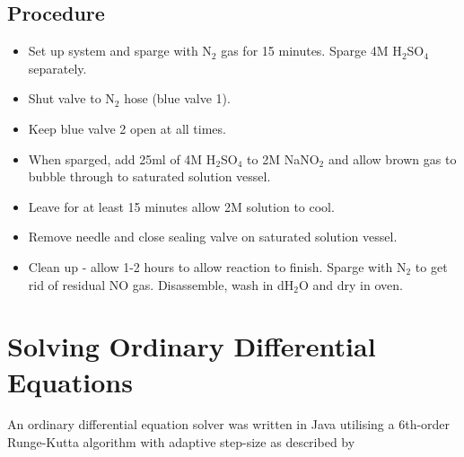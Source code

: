 \subsection*{Procedure}
\begin{itemize}
 \item Set up system and sparge with N$_{\textrm{2}}$ gas for 15 minutes. Sparge 4M H$_{\textrm{2}}$SO$_{\textrm{4}}$ separately.
 \item Shut valve to N$_{\textrm{2}}$ hose (blue valve 1).
 \item Keep blue valve 2 open at all times.
 \item When sparged, add 25ml of 4M H$_{\textrm{2}}$SO$_{\textrm{4}}$ to 2M NaNO$_{\textrm{2}}$ and allow brown gas to bubble through to saturated solution vessel.
 \item Leave for at least 15 minutes allow 2M solution to cool.
 \item Remove needle and close sealing valve on saturated solution vessel.
 \item Clean up - allow 1-2 hours to allow reaction to finish. Sparge with N$_{\textrm{2}}$ to get rid of residual NO gas. Disassemble, wash in dH$_{\textrm{2}}$O and dry in oven.
\end{itemize}

\section{Solving Ordinary Differential Equations}
An ordinary differential equation solver was written in Java utilising a 6th-order Runge-Kutta algorithm with adaptive step-size as described by \citet{WilliamH.Press1992}